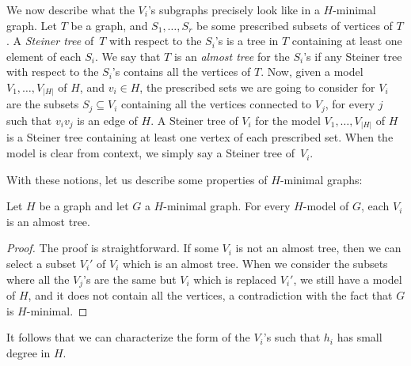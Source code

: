\documentclass[a4paper,thm-restate,USenglish]{lipics-v2019}
\begin{document}
We now describe what the $V_i$'s subgraphs precisely look like in a $H$-minimal graph.
Let $T$ be a graph, and $S_1,\ldots,S_r$ be some prescribed subsets of vertices of $T$.
A \emph{Steiner tree} of~$T$ with respect to the $S_i$'s is a tree in $T$ containing at least one element of each $S_i$.
We say that $T$ is an \emph{almost tree} for the $S_i$'s if any Steiner tree with respect to the $S_i$'s contains all the vertices of $T$.  
Now, given a model $V_1,\ldots,V_{|H|}$ of $H$, and $v_i \in H$, the prescribed sets we are going to consider for $V_i$ are the subsets $S_j\subseteq V_i$ containing all the vertices connected to $V_j$, for every $j$ such that $v_iv_j$ is an edge of $H$. 
A Steiner tree of $V_i$ for the model $V_1,\ldots,V_{|H|}$ of $H$ is a Steiner tree containing at least one vertex of each prescribed set. When the model is clear from context, we simply say a Steiner tree of~$V_i$.

With these notions, let us describe some properties of $H$-minimal graphs:
\begin{lemma}
Let $H$ be a graph and let $G$ a $H$-minimal graph. For every $H$-model of $G$, each $V_i$ is an almost tree.
\end{lemma}
\begin{proof}
The proof is straightforward. If some $V_i$ is not an almost tree, then we can select a subset $V_i'$ of $V_i$ which is an almost tree. When we consider the subsets where all the $V_j$'s are the same but $V_i$ which is replaced $V_i'$, we still have a model of $H$, and it does not contain all the vertices, a contradiction with the fact that $G$ is $H$-minimal.
\end{proof}

It follows that we can characterize the form of the $V_i$'s such that $h_i$ has small degree in $H$.
\end{document}
